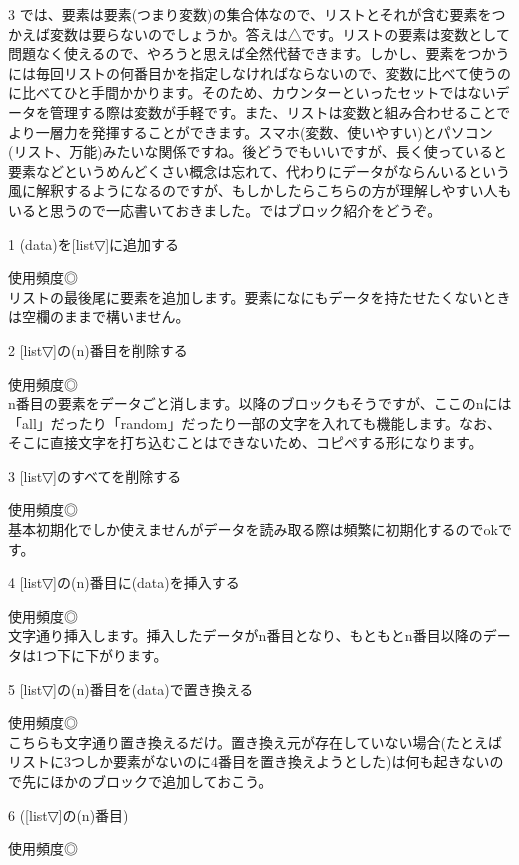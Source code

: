 \documentclass[b5paper,10pt]{jsarticle}
\begin{document}
\begin{multicols*}{3}
では、要素は要素(つまり変数)の集合体なので、リストとそれが含む要素をつかえば変数は要らないのでしょうか。答えは△です。リストの要素は変数として問題なく使えるので、やろうと思えば全然代替できます。しかし、要素をつかうには毎回リストの何番目かを指定しなければならないので、変数に比べて使うのに比べてひと手間かかります。そのため、カウンターといったセットではないデータを管理する際は変数が手軽です。また、リストは変数と組み合わせることでより一層力を発揮することができます。スマホ(変数、使いやすい)とパソコン(リスト、万能)みたいな関係ですね。後どうでもいいですが、長く使っていると要素などというめんどくさい概念は忘れて、代わりにデータがならんいるという風に解釈するようになるのですが、もしかしたらこちらの方が理解しやすい人もいると思うので一応書いておきました。ではブロック紹介をどうぞ。
\begin{itembox}{1}
(data)を[list▽]に追加する
\end{itembox}
使用頻度◎\\
リストの最後尾に要素を追加します。要素になにもデータを持たせたくないときは空欄のままで構いません。
\begin{itembox}{2}
[list▽]の(n)番目を削除する
\end{itembox}
使用頻度◎\\
n番目の要素をデータごと消します。以降のブロックもそうですが、ここのnには「all」だったり「random」だったり一部の文字を入れても機能します。なお、そこに直接文字を打ち込むことはできないため、コピペする形になります。
\begin{itembox}{3}
[list▽]のすべてを削除する
\end{itembox}
使用頻度◎\\
基本初期化でしか使えませんがデータを読み取る際は頻繁に初期化するのでokです。
\begin{itembox}{4}
[list▽]の(n)番目に(data)を挿入する
\end{itembox}
使用頻度◎\\
文字通り挿入します。挿入したデータがn番目となり、もともとn番目以降のデータは1つ下に下がります。
\begin{itembox}{5}
[list▽]の(n)番目を(data)で置き換える
\end{itembox}
使用頻度◎\\
こちらも文字通り置き換えるだけ。置き換え元が存在していない場合(たとえばリストに3つしか要素がないのに4番目を置き換えようとした)は何も起きないので先にほかのブロックで追加しておこう。
\begin{itembox}{6}
([list▽]の(n)番目)
\end{itembox}
使用頻度◎\\

\end{multicols*}
\end{document}
